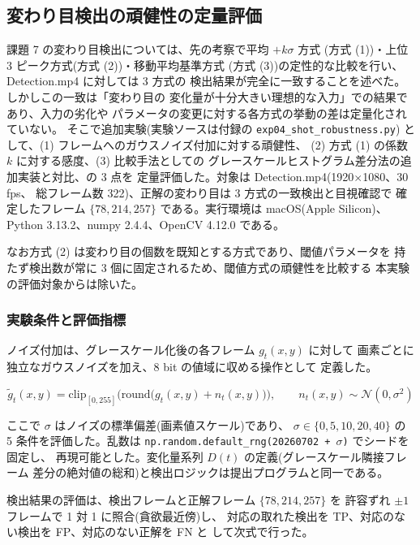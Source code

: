 \subsection{変わり目検出の頑健性の定量評価}

課題 7 の変わり目検出については、先の考察で平均 $+k\sigma$ 方式
(方式 (1))・上位 3 ピーク方式(方式 (2))・移動平均基準方式
(方式 (3))の定性的な比較を行い、Detection.mp4 に対しては 3 方式の
検出結果が完全に一致することを述べた。しかしこの一致は「変わり目の
変化量が十分大きい理想的な入力」での結果であり、入力の劣化や
パラメータの変更に対する各方式の挙動の差は定量化されていない。
そこで追加実験(実験ソースは付録の {\tt exp04\_shot\_robustness.py})
として、(1) フレームへのガウスノイズ付加に対する頑健性、
(2) 方式 (1) の係数 $k$ に対する感度、(3) 比較手法としての
グレースケールヒストグラム差分法の追加実装と対比、の 3 点を
定量評価した。対象は Detection.mp4(1920$\times$1080、30 fps、
総フレーム数 322)、正解の変わり目は 3 方式の一致検出と目視確認で
確定したフレーム $\{78, 214, 257\}$ である。実行環境は
macOS(Apple Silicon)、Python 3.13.2、numpy 2.4.4、OpenCV 4.12.0
である。

なお方式 (2) は変わり目の個数を既知とする方式であり、閾値パラメータを
持たず検出数が常に 3 個に固定されるため、閾値方式の頑健性を比較する
本実験の評価対象からは除いた。

\subsubsection{実験条件と評価指標}

ノイズ付加は、グレースケール化後の各フレーム $g_t(x, y)$ に対して
画素ごとに独立なガウスノイズを加え、8 bit の値域に収める操作として
定義した。

\begin{equation}\label{eq:b4-noise}
\tilde{g}_t(x, y) = \mathrm{clip}_{[0, 255]}\bigl(
\mathrm{round}\bigl(g_t(x, y) + n_t(x, y)\bigr)\bigr),
\qquad n_t(x, y) \sim \mathcal{N}(0, \sigma^2)
\end{equation}

ここで $\sigma$ はノイズの標準偏差(画素値スケール)であり、
$\sigma \in \{0, 5, 10, 20, 40\}$ の 5 条件を評価した。乱数は
{\tt np.random.default\_rng(20260702 + $\sigma$)} でシードを固定し、
再現可能とした。変化量系列 $D(t)$ の定義(グレースケール隣接フレーム
差分の絶対値の総和)と検出ロジックは提出プログラムと同一である。

検出結果の評価は、検出フレームと正解フレーム $\{78, 214, 257\}$ を
許容ずれ $\pm 1$ フレームで 1 対 1 に照合(貪欲最近傍)し、
対応の取れた検出を TP、対応のない検出を FP、対応のない正解を FN と
して次式で行った。

